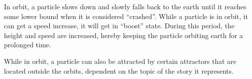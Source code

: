 In orbit, a particle slows down and slowly falls back to the earth until it
reaches some lower bound when it is considered ``crashed''. While a particle is
in orbit, it can get a speed increase, it will get in ``boost'' state. During
this period, the height and speed are increased, hereby keeping the particle
orbiting earth for a prolonged time.

While in orbit, a particle can also be attracted by certain attractors that are
located outside the orbits, dependent on the topic of the story it represents.


\begin{classmetadata}
\end{classmetadata}



